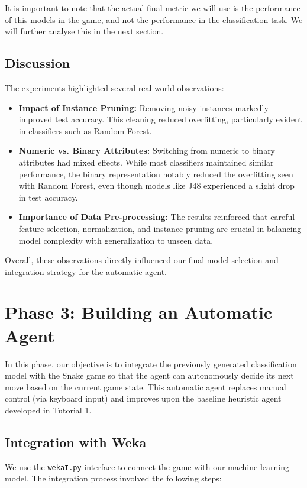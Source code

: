 \documentclass[12pt,a4paper]{article}
\begin{document}
It is important to note that the actual final metric we will use is the performance of this models in the game, and not the performance in the classification task.
We will further analyse this in the next section.




\subsection{Discussion}
The experiments highlighted several real-world observations:
\begin{itemize}
    \item \textbf{Impact of Instance Pruning:} Removing noisy instances markedly improved test accuracy. This cleaning reduced overfitting, particularly evident in classifiers such as Random Forest.
    \item \textbf{Numeric vs. Binary Attributes:} Switching from numeric to binary attributes had mixed effects. While most classifiers maintained similar performance, the binary representation notably reduced the overfitting seen with Random Forest, even though models like J48 experienced a slight drop in test accuracy.
    \item \textbf{Importance of Data Pre-processing:} The results reinforced that careful feature selection, normalization, and instance pruning are crucial in balancing model complexity with generalization to unseen data.
\end{itemize}

Overall, these observations directly influenced our final model selection and integration strategy for the automatic agent.


\newpage
\section{Phase 3: Building an Automatic Agent}

In this phase, our objective is to integrate the previously generated classification model with the Snake game so that the agent can autonomously decide its next move based on the current game state. This automatic agent replaces manual control (via keyboard input) and improves upon the baseline heuristic agent developed in Tutorial 1.

\subsection{Integration with Weka}

We use the \texttt{wekaI.py} interface to connect the game with our machine learning model. The integration process involved the following steps:
\end{document}
